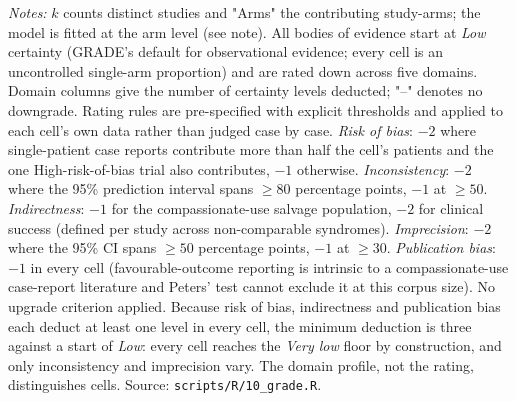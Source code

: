 \begin{table}[htbp]
\centering
\scriptsize
\setlength{\tabcolsep}{3pt}
\begin{threeparttable}
\caption{GRADE certainty of evidence for the 14 pooled outcome-stratum cells}
\label{tab:grade}

\begin{tablenotes}
\small
\item \textit{Notes:} $k$ counts distinct studies and "Arms" the contributing study-arms; the model is fitted at the arm level (see  note). All bodies of evidence start at \emph{Low} certainty (GRADE's default for observational evidence; every cell is an uncontrolled single-arm proportion) and are rated down across five domains. Domain columns give the number of certainty levels deducted; "--" denotes no downgrade. Rating rules are pre-specified with explicit thresholds and applied to each cell's own data rather than judged case by case. \emph{Risk of bias}: $-2$ where single-patient case reports contribute more than half the cell's patients and the one High-risk-of-bias trial also contributes, $-1$ otherwise. \emph{Inconsistency}: $-2$ where the 95\% prediction interval spans $\geq 80$ percentage points, $-1$ at $\geq 50$. \emph{Indirectness}: $-1$ for the compassionate-use salvage population, $-2$ for clinical success (defined per study across non-comparable syndromes). \emph{Imprecision}: $-2$ where the 95\% CI spans $\geq 50$ percentage points, $-1$ at $\geq 30$. \emph{Publication bias}: $-1$ in every cell (favourable-outcome reporting is intrinsic to a compassionate-use case-report literature and Peters' test cannot exclude it at this corpus size). No upgrade criterion applied. Because risk of bias, indirectness and publication bias each deduct at least one level in every cell, the minimum deduction is three against a start of \emph{Low}: every cell reaches the \emph{Very low} floor by construction, and only inconsistency and imprecision vary. The domain profile, not the rating, distinguishes cells. Source: \texttt{scripts/R/10\_grade.R}.
\end{tablenotes}
\end{threeparttable}
\end{table}
